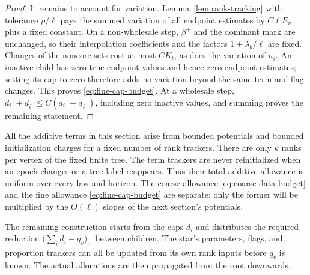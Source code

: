 \begin{proof}
It remains to account for variation.  Lemma~\ref{lem:rank-tracking}
with tolerance $\rho/\ell$ pays the summed variation of all endpoint
estimates by $C\ell E_v$ plus a fixed constant.  On a non-wholesale
step, $\beta^+$ and the dominant mark are unchanged, so their
interpolation coefficients and the factors $1\pm\lambda_b/\ell$
are fixed.  Changes of the noncore sets cost at most $CK_t$, as does
the variation of $n_i$.  An inactive child has zero true endpoint
values and hence zero endpoint estimates; setting its cap to zero
therefore adds no variation beyond the same term and flag changes.
This proves \eqref{eq:fine-cap-budget}.  At a wholesale step,
$d_i^-+d_i^+\le C(a_i^-+a_i^+)$, including zero inactive values,
and summing proves the remaining statement.
\end{proof}

All the additive terms in this section arise from bounded potentials
and bounded initialization charges for a fixed number of rank trackers.
There are only $k$ ranks per vertex of the fixed finite tree.
The term trackers are never reinitialized when an epoch changes or a
tree label reappears.  Thus their total additive allowance is uniform
over every law and horizon.  The coarse allowance
\eqref{eq:coarse-data-budget} and the fine allowance
\eqref{eq:fine-cap-budget} are separate: only the former will be
multiplied by the $O(\ell)$ slopes of the next section's potentials.

The remaining construction starts from the caps $d_i$ and distributes
the required reduction $\bigl(\sum_i d_i-q_v\bigr)_+$ between children.
The star's parameters, flags, and proportion trackers can all be
updated from its own rank inputs before $q_v$ is known.  The actual
allocations are then propagated from the root downwards.
